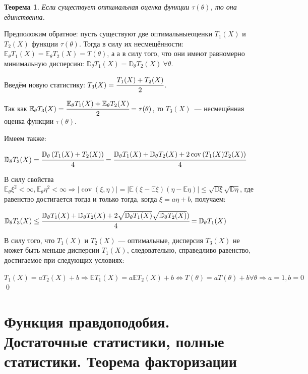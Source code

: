 \documentclass[oneside,final,14pt]{extreport}
\renewenvironment{proof}{{\bfseries Доказательство.}}{\qed}
\newtheorem{thm}{Теорема}[section]
\theoremstyle{definition}
\begin{document}
\begin{thm}
Если существует оптимальная оценка функции \( \tau(\theta) \), то она единственна.
\end{thm}

\begin{proof}
Предположим обратное: пусть существуют две оптимальныеоценки \(T_1(X) \) и \( T_2(X) \) функции \( \tau(\theta) \). Тогда в силу их несмещённости: \(\mathbb{E}_{\theta} T_{1}(X)=\mathbb{E}_{\theta} T_{2}(X)=T(\theta)\), а а в силу того, что они имеют равномерно минимальную дисперсию: \( \mathbb{D}_{\theta} T_{1}(X)=\mathbb{D}_{\theta} T_{2}(X)~ \forall \theta \).

Введём новую статистику: \( T_{3}(X)=\cfrac{T_{1}(X)+T_{2}(X)}{2} \).

Так как \(\mathbb{E}_{\theta} T_{3}(X)=\cfrac{\mathbb{E}_{\theta} T_{1}(X)+\mathbb{E}_{\theta} T_{2}(X)}{2}=\tau(\theta) \), то \( T_{3}(X) \)~--- несмещённая оценка функции \( \tau(\theta) \).

Имеем также:

\( \mathbb{D}_{\theta} T_{3}(X)=\cfrac{\mathbb{D}_{\theta}\left(T_{1}(X)+T_{2}(X)\right)}{4} =
\cfrac{\mathbb{D}_{\theta} T_{1}(X)+\mathbb{D}_{\theta} T_{2}(X)+2 \operatorname{cov}\left(T_{1}(X) T_{2}(X)\right)}{4} \)

В силу свойства 
\( \mathbb{E}_{\theta} \xi^{2}<\infty, \mathbb{E}_{\theta} \eta^{2}<\infty \Rightarrow|\operatorname{cov}(\xi, \eta)| = | \mathbb{E}(\xi-\mathbb{E} \xi)(\eta-\mathbb{E} \eta)| \leq \sqrt{\mathbb{D} \xi} \sqrt{\mathbb{D} \eta} \), где равенство достигается тогда и только тогда, когда \( \xi=a \eta+b \), получаем:

\( \mathbb{D}_{\theta} T_{3}(X) \leq \cfrac{\mathbb{D}_{\theta} T_{1}(X)+\mathbb{D}_{\theta} T_{2}(X)+2 \sqrt{\mathbb{D}_{\theta} T_{1}(X)} \sqrt{\mathbb{D}_{\theta} T_{2}(X)})}{4} =\mathbb{D}_{\theta} T_{1}(X) \)

В силу того, что \( T_1(X) \) и \( T_2(X) \) — оптимальные, дисперсия \( T_3(X) \) не может быть меньше дисперсии \( T_1(X) \), следовательно, справедливо равенство, достигаемое при следующих условиях:

\( T_{1}(X)=a T_{2}(X)+b \Rightarrow \mathbb{E} T_{1}(X)=a \mathbb{E} T_{2}(X)+b \Leftrightarrow T(\theta)=a T(\theta)+b \forall \theta \Rightarrow a=1, b=0 \)
\end{proof}

\section{Функция правдоподобия. Достаточные статистики, полные статистики. Теорема факторизации}
\end{document}
